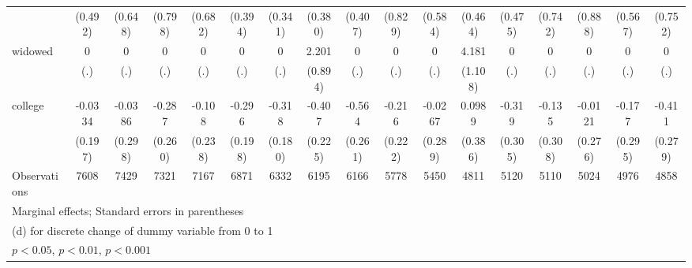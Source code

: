 {\begin{tabular}{l*{16}{c}}
                    &     (0.492)         &     (0.648)         &     (0.798)         &     (0.682)         &     (0.394)         &     (0.341)         &     (0.380)         &     (0.407)         &     (0.829)         &     (0.584)         &     (0.464)         &     (0.475)         &     (0.742)         &     (0.888)         &     (0.567)         &     (0.752)         \\
[1em]
widowed             &           0         &           0         &           0         &           0         &           0         &           0         &       2.201\sym{*}  &           0         &           0         &           0         &       4.181\sym{***}&           0         &           0         &           0         &           0         &           0         \\
                    &         (.)         &         (.)         &         (.)         &         (.)         &         (.)         &         (.)         &     (0.894)         &         (.)         &         (.)         &         (.)         &     (1.108)         &         (.)         &         (.)         &         (.)         &         (.)         &         (.)         \\
[1em]
college             &     -0.0334         &     -0.0386         &      -0.287         &      -0.108         &      -0.296         &      -0.318         &      -0.407         &      -0.564\sym{*}  &      -0.216         &     -0.0267         &      0.0989         &      -0.319         &      -0.135         &     -0.0121         &      -0.177         &      -0.411         \\
                    &     (0.197)         &     (0.298)         &     (0.260)         &     (0.238)         &     (0.198)         &     (0.180)         &     (0.225)         &     (0.261)         &     (0.222)         &     (0.289)         &     (0.386)         &     (0.305)         &     (0.308)         &     (0.276)         &     (0.295)         &     (0.279)         \\
\hline
Observations        &        7608         &        7429         &        7321         &        7167         &        6871         &        6332         &        6195         &        6166         &        5778         &        5450         &        4811         &        5120         &        5110         &        5024         &        4976         &        4858         \\
\hline\hline
\multicolumn{17}{l}{\footnotesize Marginal effects; Standard errors in parentheses}\\
\multicolumn{17}{l}{\footnotesize  (d) for discrete change of dummy variable from 0 to 1}\\
\multicolumn{17}{l}{\footnotesize \sym{*} \(p<0.05\), \sym{**} \(p<0.01\), \sym{***} \(p<0.001\)}\\
\end{tabular}
}
